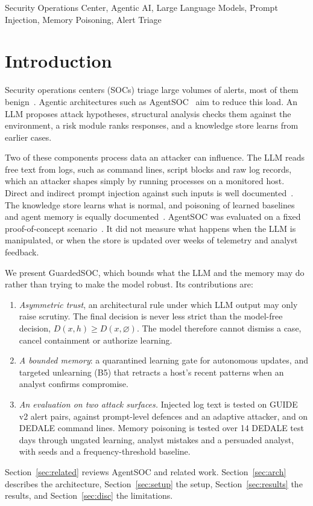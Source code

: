 \documentclass[conference]{IEEEtran}
\begin{document}
\begin{IEEEkeywords}
Security Operations Center, Agentic AI, Large Language Models, Prompt Injection, Memory Poisoning, Alert Triage
\end{IEEEkeywords}

\section{Introduction}

Security operations centers (SOCs) triage large volumes of alerts, most of them benign~\cite{alahmadi}. Agentic
architectures such as AgentSOC~\cite{agentsoc} aim to reduce this load. An LLM proposes attack hypotheses,
structural analysis checks them against the environment, a risk module ranks responses, and a knowledge store
learns from earlier cases.

Two of these components process data an attacker can influence. The LLM reads free text from logs, such as command
lines, script blocks and raw log records, which an attacker shapes simply by running processes on a monitored host.
Direct and indirect prompt injection against such inputs is well documented~\cite{perez,greshake,liu}. The
knowledge store learns what is normal, and poisoning of learned baselines and agent memory is equally
documented~\cite{antidote,agentpoison,poisonedrag}. AgentSOC was evaluated on a fixed proof-of-concept
scenario~\cite{agentsoc}. It did not measure what happens when the LLM is manipulated, or when the store is updated
over weeks of telemetry and analyst feedback.

We present GuardedSOC, which bounds what the LLM and the memory may do rather than trying to make the model robust.
Its contributions are:
\begin{enumerate}
\item \emph{Asymmetric trust}, an architectural rule under which LLM output may only raise scrutiny. The final
decision is never less strict than the model-free decision, $D(x,h) \ge D(x,\varnothing)$. The model therefore
cannot dismiss a case, cancel containment or authorize learning.
\item \emph{A bounded memory}: a quarantined learning gate for autonomous updates, and targeted unlearning (B5)
that retracts a host's recent patterns when an analyst confirms compromise.
\item \emph{An evaluation on two attack surfaces.} Injected log text is tested on GUIDE v2 alert pairs, against
prompt-level defences and an adaptive attacker, and on DEDALE command lines. Memory poisoning is tested over 14
DEDALE test days through ungated learning, analyst mistakes and a persuaded analyst, with seeds and a
frequency-threshold baseline.
\end{enumerate}
Section~\ref{sec:related} reviews AgentSOC and related work. Section~\ref{sec:arch} describes the architecture,
Section~\ref{sec:setup} the setup, Section~\ref{sec:results} the results, and Section~\ref{sec:disc} the
limitations.
\end{document}
